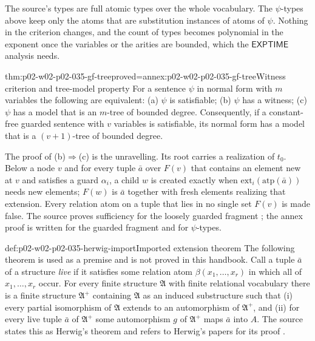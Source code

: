 The source's types are full atomic types over the whole vocabulary.  The
\(\psi\)-types above keep only the atoms that are substitution instances of
atoms of \(\psi\).  Nothing in the criterion changes, and the count of types
becomes polynomial in the exponent once the variables or the arities are
bounded, which the \(\mathsf{EXPTIME}\) analysis needs.

\begin{hbtheorem}{thm:p02-w02-p02-035-gf-tree}{proved=annex:p02-w02-p02-035-gf-tree}{Witness criterion and tree-model property}
For a sentence \(\psi\) in normal form with \(m\) variables the following are
equivalent: (a) \(\psi\) is satisfiable; (b) \(\psi\) has a witness;
(c) \(\psi\) has a model that is an \(m\)-tree of bounded degree.
Consequently, if a constant-free guarded sentence with \(v\) variables is
satisfiable, its normal form has a model that is a \((v+1)\)-tree of bounded
degree.
\end{hbtheorem}

The proof of (b)\(\Rightarrow\)(c) is the unravelling.  Its root carries a
realization of \(t_0\).  Below a node \(v\) and for every tuple \(\bar a\)
over \(F(v)\) that contains an element new at \(v\) and satisfies a guard
\(\alpha_i\), a child \(w\) is created exactly when
\(\mathrm{ext}_i(\mathrm{atp}(\bar a))\) needs new elements; \(F(w)\) is
\(\bar a\) together with fresh elements realizing that extension.  Every
relation atom on a tuple that lies in no single set \(F(v)\) is made false.
The source proves sufficiency for the loosely guarded fragment
\cite[lem.~3.4, lem.~3.6 and thm.~3.7]{Gradel1999}; the annex proof is
written for the guarded fragment and for \(\psi\)-types.

\begin{proofboundary}{def:p02-w02-p02-035-herwig-import}{Imported extension theorem}
The following theorem is used as a premise and is not proved in this
handbook.  Call a tuple \(\bar a\) of a structure \emph{live} if it satisfies
some relation atom \(\beta(x_1,\ldots,x_r)\) in which all of
\(x_1,\ldots,x_r\) occur.  For every finite structure \(\mathfrak A\) with
finite relational vocabulary there is a finite structure \(\mathfrak A^{+}\)
containing \(\mathfrak A\) as an induced substructure such that (i) every
partial isomorphism of \(\mathfrak A\) extends to an automorphism of
\(\mathfrak A^{+}\), and (ii) for every live tuple \(\bar a\) of
\(\mathfrak A^{+}\) some automorphism \(g\) of \(\mathfrak A^{+}\) maps
\(\bar a\) into \(A\).  The source states this as Herwig's theorem and refers
to Herwig's papers for its proof \cite[def.~3.8 and thm.~3.9]{Gradel1999}.
\end{proofboundary}

